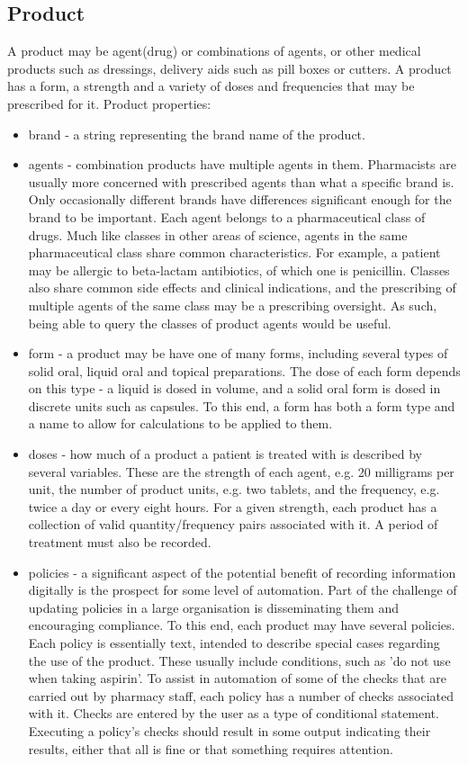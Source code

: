 \documentclass[letterpaper]{amsart}
\begin{document}
\subsection{Product}
A product may be agent(drug) or combinations of agents, or other medical products such as dressings, delivery aids such as pill boxes or cutters.  
A product has a form, a strength and a variety of doses and frequencies that may be prescribed for it. 
Product properties:
\begin{itemize}
    \item brand - a string representing the brand name of the product. 
    \item agents - combination products have multiple agents in them.  Pharmacists are usually more concerned with prescribed agents than what a specific brand is.  Only occasionally different brands have differences significant enough for the brand to be important. Each agent belongs to a pharmaceutical class of drugs. Much like classes in other areas of science, agents in the same pharmaceutical class share common characteristics.  For example, a patient may be allergic to beta-lactam antibiotics, of which one is penicillin.
	Classes also share common side effects and clinical indications, and the prescribing of multiple agents of the same class may be a prescribing oversight.  As such, being able to query the classes of product agents would be useful.
    \item form - a product may be have one of many forms, including several types of solid oral, liquid oral and topical preparations.  The dose of each form depends on this type - a liquid is dosed in volume, and a solid oral form is dosed in discrete units such as capsules.  To this end, a form has both a form type and a name to allow for calculations to be applied to them. 
    \item doses - how much of a product a patient is treated with is described by several variables.  These are the strength of each agent, e.g. 20 milligrams per unit, the number of product units, e.g. two tablets, and the frequency, e.g. twice a day or every eight hours.
    For a given strength, each product has a collection of valid quantity/frequency pairs associated with it.  A period of treatment must also be recorded.
    \item policies - a significant aspect of the potential benefit of recording information digitally is the prospect for some level of automation.  Part of the challenge of updating policies in a large organisation is disseminating them and encouraging compliance.  To this end, each product may have several policies.  Each policy is essentially text, intended to describe special cases regarding the use of the product.  These usually include conditions, such as 'do not use when taking aspirin'.  To assist in automation of some of the checks that are carried out by pharmacy staff, each policy has a number of checks associated with it.  Checks are entered by the user as a type of conditional statement.  Executing a policy's checks should result in some output indicating their results, either that all is fine or that something requires attention. 

\end{itemize}
\end{document}
